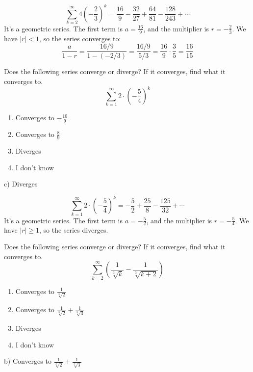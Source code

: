 \documentclass[addpoints,12pt,answers]{exam}
\begin{document}
\begin{questions}
\begin{solution}
    $$\sum_{k=2}^\infty 4\left(-\frac{2}{3}\right)^{k}=\frac{16}{9}-\frac{32}{27}+\frac{64}{81}-\frac{128}{243}+\cdots$$
    It's a geometric series. The first term is $\displaystyle a=\frac{16}{9}$, and the multiplier is $\displaystyle r=-\frac{2}{3}$. We have $|r|<1$, so the series converges to:
    $$\frac{a}{1-r}=\frac{16/9}{1-(-2/3)}=\frac{16/9}{5/3}=\frac{16}{9}\cdot\frac{3}{5}=\frac{16}{15}$$
  \end{solution}
  \newpage
  \question
  Does the following series converge or diverge? If it converges, find what it converges to.
  $$\sum_{k=1}^\infty 2\cdot\left(-\frac{5}{4}\right)^{k}$$
  \begin{enumerate}[label=\alph*)]
    \item
    Converges to $\displaystyle-\frac{10}{9}$
    \item
    Converges to $\displaystyle\frac{8}{9}$
    \item
    Diverges
    \item
    I don't know
  \end{enumerate}
  \begin{solution}
    c) Diverges
    
    $$\sum_{k=1}^\infty 2\cdot\left(-\frac{5}{4}\right)^{k}=-\frac{5}{2}+\frac{25}{8}-\frac{125}{32}+\cdots$$
    It's a geometric series. The first term is $\displaystyle a=-\frac{5}{2}$, and the multiplier is $\displaystyle r=-\frac{5}{4}$. We have $|r|\ge 1$, so the series diverges.
  \end{solution}
  \newpage
  \question
  Does the following series converge or diverge? If it converges, find what it converges to.
  $$\sum_{k=2}^\infty\left(\frac{1}{\sqrt[3]{k}}-\frac{1}{\sqrt[3]{k+2}}\right)$$
  \begin{enumerate}[label=\alph*)]
    \item
    Converges to $\displaystyle\frac{1}{\sqrt[3]{2}}$
    \item
    Converges to $\displaystyle\frac{1}{\sqrt[3]{2}}+\frac{1}{\sqrt[3]{3}}$
    \item
    Diverges
    \item
    I don't know
  \end{enumerate}
  \begin{solution}
    b) Converges to $\displaystyle\frac{1}{\sqrt[3]{2}}+\frac{1}{\sqrt[3]{3}}$
    

\end{solution}
\end{questions}
\end{document}
